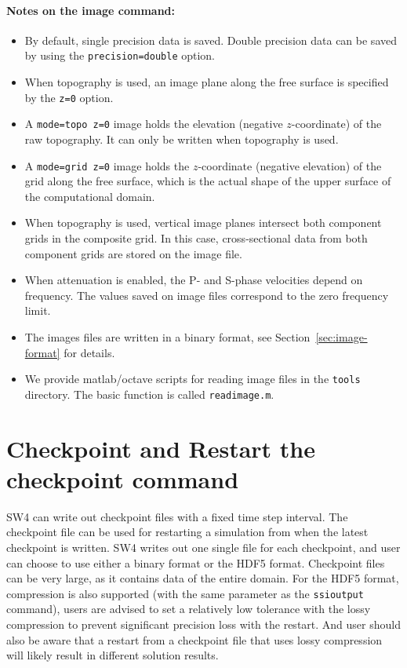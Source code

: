 \documentclass[11pt]{report}
\begin{document}
\paragraph{Notes on the image command:}
\begin{itemize}
\item By default, single precision data is saved. Double precision data can be saved by
  using the {\tt precision=double} option.
\item When topography is used, an image plane along the free surface is specified by the {\tt z=0} option.
\item A {\tt mode=topo z=0} image holds the elevation (negative $z$-coordinate) of the raw
  topography. It can only be written when topography is used.
\item A {\tt mode=grid z=0} image holds the $z$-coordinate (negative elevation) of the grid along
  the free surface, which is the actual shape of the upper surface of the computational domain.
\item When topography is used, vertical image planes intersect both component
grids in the composite grid. In this case, cross-sectional data from both component grids are stored
on the image file.
\item When attenuation is enabled, the P- and S-phase velocities depend on frequency. The values
  saved on image files correspond to the zero frequency limit.
\item The images files are written in a binary format, see Section~\ref{sec:image-format} for
  details.
\item We provide matlab/octave scripts for reading image files in the {\tt tools} directory. The
  basic function is called {\tt readimage.m}. 
\end{itemize}

\section{Checkpoint and Restart the checkpoint command}\label{sec:checkpoint}
SW4 can write out checkpoint files with a fixed time step interval. The checkpoint file can be used for restarting a simulation from when the latest checkpoint is written. SW4 writes out one single file for each checkpoint, and user can choose to use either a binary format or the HDF5 format. Checkpoint files can be very large, as it contains data of the entire domain. For the HDF5 format, compression is also supported (with the same parameter as the \verb+ssioutput+ command), users are advised to set a relatively low tolerance with the lossy compression to prevent significant precision loss with the restart. And user should also be aware that a restart from a checkpoint file that uses lossy compression will likely result in different solution results.
\end{document}
